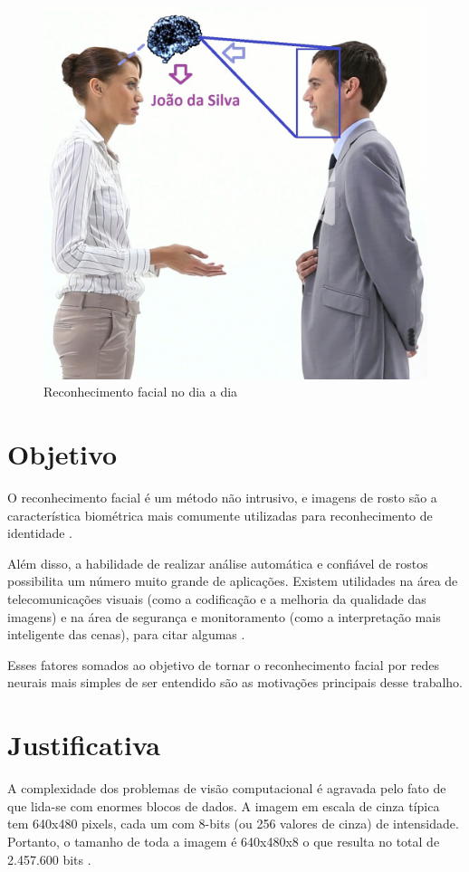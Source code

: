 \documentclass[hidelinks,11pt,twocolumn]{article}
\begin{document}
\begin{figure}[H]
\centering
\graphicspath{{IMAGENS/}}
\includegraphics[width = 0.55\linewidth]{reconhecimento.jpg}
\setlength{\abovecaptionskip}{0pt}
\setlength{\belowcaptionskip}{0pt}
\caption{Reconhecimento facial no dia a dia}
\label{diaadia}
\end{figure}

\section{Objetivo}

O reconhecimento facial é um método não intrusivo, e imagens de rosto são a característica biométrica mais comumente utilizadas para reconhecimento de identidade \cite{yesu}. 

Além disso, a habilidade de realizar análise automática e confiável de rostos possibilita um número muito grande de aplicações. Existem utilidades na área de telecomunicações visuais (como a codificação e a melhoria da qualidade das imagens) e na área de segurança e monitoramento (como a interpretação mais inteligente das cenas), para citar algumas \cite{nightingale}.

Esses fatores somados ao objetivo de tornar o reconhecimento facial por redes neurais mais simples de ser entendido são as motivações principais desse trabalho.

\section{Justificativa}

A complexidade dos problemas de visão computacional é agravada pelo fato de que lida-se com enormes blocos de dados. A imagem em escala de cinza típica tem 640x480 pixels, cada um com 8-bits (ou 256 valores de cinza) de intensidade. Portanto, o tamanho de toda a imagem é 640x480x8 o que resulta no total de 2.457.600 bits \cite{balasuriya}. 
\end{document}
